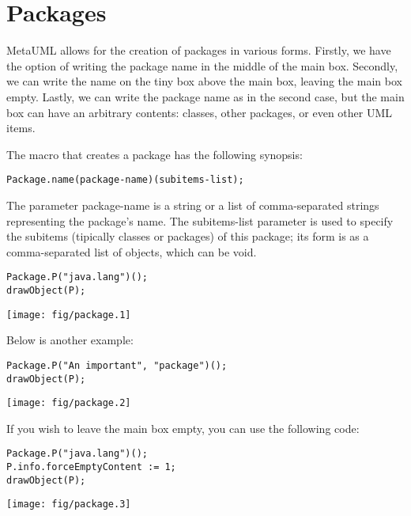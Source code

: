 \documentclass{article}
\newcommand{\code}{\ttfamily}
\begin{document}
\section{Packages}

MetaUML allows for the creation of packages in various forms. Firstly, we have the option of writing the package 
name in the middle of the main box. Secondly, we can write the name on the tiny box above the main box, leaving 
the main box empty. Lastly, we can write the package name as in the second case, but the main box can have an arbitrary
contents: classes, other packages, or even other UML items. 

The macro that creates a package has the following synopsis:

\begin{verbatim}
Package.name(package-name)(subitems-list);
\end{verbatim}

The parameter {\code package-name} is a string or a list of comma-separated strings representing the package's name.
The {\code subitems-list} parameter is used to specify the subitems (tipically classes or packages) of this package;
its form is as a comma-separated list of objects, which can be void.

\begin{multicols}{2}
\begin{verbatim}
Package.P("java.lang")();
drawObject(P);
\end{verbatim}
\columnbreak
\hspace{3cm}\texttt{[image: fig/package.1]}
\end{multicols}

Below is another example:

\begin{multicols}{2}
\begin{verbatim}
Package.P("An important", "package")();
drawObject(P);
\end{verbatim}
\columnbreak
\hspace{3cm}\texttt{[image: fig/package.2]}
\end{multicols}

If you wish to leave the main box empty, you can use the following code:

\begin{multicols}{2}
\begin{verbatim}
Package.P("java.lang")();
P.info.forceEmptyContent := 1;
drawObject(P);
\end{verbatim}
\columnbreak
\hspace{3cm}\texttt{[image: fig/package.3]}
\end{multicols}
\end{document}
